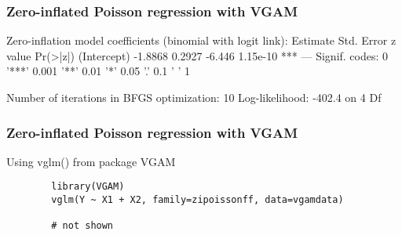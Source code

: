 \documentclass{beamer}
\begin{document}
	\begin{frame}[fragile]
		\frametitle{Zero-inflated Poisson regression with VGAM}
		Zero-inflation model coefficients (binomial with logit link):
		Estimate Std. Error z value Pr(>|z|)    
		(Intercept)  -1.8868     0.2927  -6.446 1.15e-10 ***
		---
		Signif. codes:  0 '***' 0.001 '**' 0.01 '*' 0.05 '.' 0.1 ' ' 1 
		
		Number of iterations in BFGS optimization: 10 
		Log-likelihood: -402.4 on 4 Df
	\end{frame}
	\begin{frame}[fragile]
		\frametitle{Zero-inflated Poisson regression with VGAM}
		
		Using vglm() from package VGAM
		\begin{verbatim}
		library(VGAM)
		vglm(Y ~ X1 + X2, family=zipoissonff, data=vgamdata)
		
		# not shown
		\end{verbatim}
	\end{frame}
\end{document}
